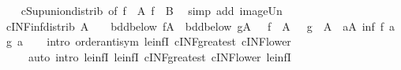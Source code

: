 \begin{isabellebody}
%
\isadelimproof
\ \ %
\endisadelimproof
%
\isatagproof
{}\isamarkupfalse%
\ cSup{\isacharunderscore}{\kern0pt}union{\isacharunderscore}{\kern0pt}distrib\ {\isacharbrackleft}{\kern0pt}of\ {\isachardoublequoteopen}f\ {\isacharbackquote}{\kern0pt}\ A{\isachardoublequoteclose}\ {\isachardoublequoteopen}f\ {\isacharbackquote}{\kern0pt}\ B{\isachardoublequoteclose}{\isacharbrackright}{\kern0pt}\ \isamarkupfalse%
\ {\isacharparenleft}{\kern0pt}simp\ add{\isacharcolon}{\kern0pt}\ image{\isacharunderscore}{\kern0pt}Un{\isacharparenright}{\kern0pt}%
\endisatagproof
{\isafoldproof}%
%
\isadelimproof
\isanewline
%
\endisadelimproof
\isanewline
{}\isamarkupfalse%
\ cINF{\isacharunderscore}{\kern0pt}inf{\isacharunderscore}{\kern0pt}distrib{\isacharcolon}{\kern0pt}\ {\isachardoublequoteopen}A\ {\isasymnoteq}\ {\isacharbraceleft}{\kern0pt}{\isacharbraceright}{\kern0pt}\ {\isasymLongrightarrow}\ bdd{\isacharunderscore}{\kern0pt}below\ {\isacharparenleft}{\kern0pt}f{\isacharbackquote}{\kern0pt}A{\isacharparenright}{\kern0pt}\ {\isasymLongrightarrow}\ bdd{\isacharunderscore}{\kern0pt}below\ {\isacharparenleft}{\kern0pt}g{\isacharbackquote}{\kern0pt}A{\isacharparenright}{\kern0pt}\ {\isasymLongrightarrow}\ {\isasymSqinter}\ {\isacharparenleft}{\kern0pt}f\ {\isacharbackquote}{\kern0pt}\ A{\isacharparenright}{\kern0pt}\ {\isasymsqinter}\ {\isasymSqinter}\ {\isacharparenleft}{\kern0pt}g\ {\isacharbackquote}{\kern0pt}\ A{\isacharparenright}{\kern0pt}\ {\isacharequal}{\kern0pt}\ {\isacharparenleft}{\kern0pt}{\isasymSqinter}a{\isasymin}A{\isachardot}{\kern0pt}\ inf\ {\isacharparenleft}{\kern0pt}f\ a{\isacharparenright}{\kern0pt}\ {\isacharparenleft}{\kern0pt}g\ a{\isacharparenright}{\kern0pt}{\isacharparenright}{\kern0pt}{\isachardoublequoteclose}\isanewline
%
\isadelimproof
\ \ %
\endisadelimproof
%
\isatagproof
{}\isamarkupfalse%
\ {\isacharparenleft}{\kern0pt}intro\ order{\isachardot}{\kern0pt}antisym\ le{\isacharunderscore}{\kern0pt}infI\ cINF{\isacharunderscore}{\kern0pt}greatest\ cINF{\isacharunderscore}{\kern0pt}lower{}{\isacharparenright}{\kern0pt}\isanewline
\ \ \ \ \ {\isacharparenleft}{\kern0pt}auto\ intro{\isacharcolon}{\kern0pt}\ le{\isacharunderscore}{\kern0pt}infI{}\ le{\isacharunderscore}{\kern0pt}infI{}\ cINF{\isacharunderscore}{\kern0pt}greatest\ cINF{\isacharunderscore}{\kern0pt}lower\ le{\isacharunderscore}{\kern0pt}infI{\isacharparenright}{\kern0pt}%
\endisatagproof
{\isafoldproof}%
%
\isadelimproof
\isanewline
%
\endisadelimproof
\isanewline
{}\isamarkupfalse%

\end{isabellebody}
